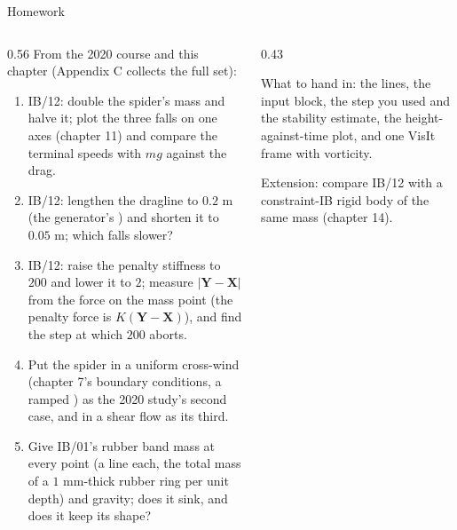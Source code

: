 \documentclass[aspectratio=169,11pt]{beamer}
\begin{document}
\begin{frame}{Homework}
\label{fr:hw}
\begin{columns}[T,onlytextwidth]
\begin{column}{0.56\textwidth}
\scriptsize From the 2020 course and this chapter (Appendix C collects the full set):
\begin{enumerate}
  \item IB/12: double the spider's mass and halve it; plot the three falls on one axes (chapter 11) and compare the terminal speeds with $m g$ against the drag.
  \item IB/12: lengthen the dragline to $0.2$ m (the generator's ) and shorten it to $0.05$ m; which falls slower?
  \item IB/12: raise the penalty stiffness to $200$ and lower it to $2$; measure $|\mathbf{Y} - \mathbf{X}|$ from the force on the mass point (the penalty force is $K(\mathbf{Y} - \mathbf{X})$), and find the step at which $200$ aborts.
  \item Put the spider in a uniform cross-wind (chapter 7's boundary conditions, a ramped ) as the 2020 study's second case, and in a shear flow as its third.
  \item Give IB/01's rubber band mass at every point (a  line each, the total mass of a $1$ mm-thick rubber ring per unit depth) and gravity; does it sink, and does it keep its shape?
\end{enumerate}
\end{column}
\begin{column}{0.43\textwidth}
\begin{punchbox}
\scriptsize What to hand in: the  lines, the input block, the step you used and the stability estimate, the height-against-time plot, and one VisIt frame with vorticity.
\end{punchbox}
\scriptsize Extension: compare IB/12 with a constraint-IB rigid body of the same mass (chapter 14).
\end{column}
\end{columns}
\end{frame}
\end{document}

